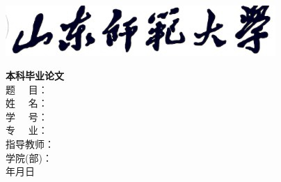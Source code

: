 \begin{titlepage}
	\vspace*{3mm}
	\begin{center}
		\includegraphics[width=0.77\textwidth,trim=8 0 0 0,clip]{data/resource/logo.jpg}
	\end{center}
	\vspace*{1cm}
	\fontsize{50pt}{24pt}
	\centering
	\textbf{本}\hfill\textbf{科}\hfill\textbf{毕}\hfill\textbf{业}\hfill\textbf{论}\hfill\textbf{文}
	\\
	\vspace*{7.7cm}
	题~ \quad ~目：\underline{\makebox[\nlength]{\sdnutitlechs}}\\\vspace*{1mm}
	姓~ \quad ~名：\underline{\makebox[\nlength]{\sdnuauthorchs}}\\\vspace*{1mm}
	学~ \quad ~号：\underline{\makebox[\nlength]{\sdnuauthorid}}\\\vspace*{1mm}
	专~ \quad ~业：\underline{\makebox[\nlength]{\sdnumajorchs}}\\\vspace*{1mm}
	指导教师：\underline{\makebox[\nlength]{\sdnumentorchs}}\\\vspace*{1mm}
	学院(部)：\underline{\makebox[\nlength]{\sdnucollegechs}}\\\vspace*{2.2cm}
	\sdnuyear 年\sdnumon 月\sdnuday 日
\end{titlepage}